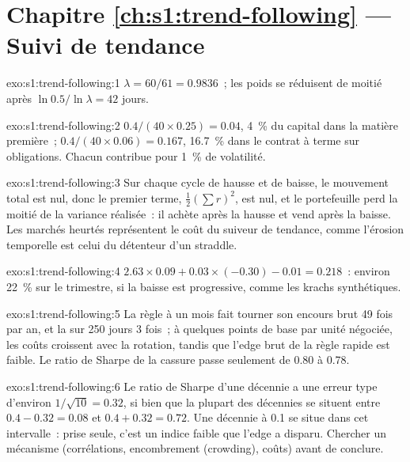 \section*{Chapitre \ref{ch:s1:trend-following} --- Suivi de tendance}

\begin{solution}{exo:s1:trend-following:1}
$\lambda = 60/61 = 0.9836$~; les poids se réduisent de moitié après $\ln 0.5/\ln \lambda = 42$ jours.
\end{solution}

\begin{solution}{exo:s1:trend-following:2}
$0.4/(40 \times 0.25) = 0.04$, 4~\% du capital dans la matière première~; $0.4/(40 \times 0.06) = 0.167$, 16.7~\% dans le contrat à terme sur obligations. Chacun contribue pour 1~\% de
volatilité.
\end{solution}

\begin{solution}{exo:s1:trend-following:3}
Sur chaque cycle de hausse et de baisse, le mouvement total est nul, donc le premier terme, $\tfrac12(\sum r)^2$, est nul, et le portefeuille perd la moitié de la variance réalisée~: il
achète après la hausse et vend après la baisse. Les marchés heurtés représentent le coût du suiveur de tendance, comme l'érosion temporelle est celui du détenteur d'un straddle.
\end{solution}

\begin{solution}{exo:s1:trend-following:4}
$2.63 \times 0.09 + 0.03 \times (-0.30) - 0.01 = 0.218$~: environ 22~\% sur le trimestre, si la baisse est progressive, comme les krachs synthétiques.
\end{solution}

\begin{solution}{exo:s1:trend-following:5}
La règle à un mois fait tourner son encours brut 49 fois par an, et la  sur 250 jours 3 fois~; à quelques points de base par unité négociée, les coûts croissent avec
la rotation, tandis que l'edge brut de la règle rapide est faible. Le ratio de Sharpe de la cassure passe seulement de 0.80 à 0.78.
\end{solution}

\begin{solution}{exo:s1:trend-following:6}
Le ratio de Sharpe d'une décennie a une erreur type d'environ $1/\sqrt{10} = 0.32$, si bien que la plupart des décennies se situent entre $0.4 - 0.32 = 0.08$ et $0.4 + 0.32 = 0.72$. Une
décennie à 0.1 se situe dans cet intervalle~: prise seule, c'est un indice faible que l'edge a disparu. Chercher un mécanisme (corrélations, encombrement (crowding), coûts) avant
de conclure.
\end{solution}

